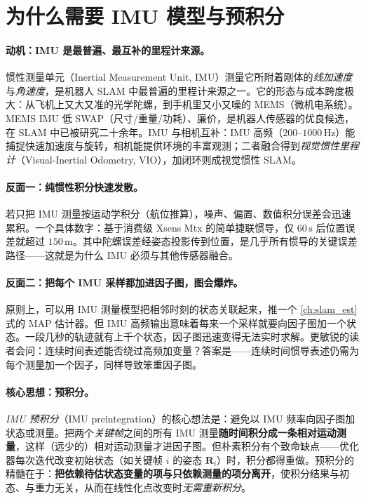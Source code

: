 \section{为什么需要 IMU 模型与预积分}
\label{sec:imu-why}

\paragraph{动机：IMU 是最普遍、最互补的里程计来源。}
惯性测量单元（Inertial Measurement Unit, IMU）测量它所附着刚体的\emph{线加速度}与\emph{角速度}，是机器人 SLAM 中最普遍的里程计来源之一\cite{carlone2026handbook}。它的形态与成本跨度极大：从飞机上又大又准的光学陀螺，到手机里又小又噪的 MEMS（微机电系统）。MEMS IMU 低 SWAP（尺寸/重量/功耗）、廉价，是机器人传感器的优良候选，在 SLAM 中已被研究二十余年。IMU 与相机互补：IMU 高频（$200$--$1000\,\mathrm{Hz}$）能捕捉快速加速度与旋转，相机能提供环境的丰富观测；二者融合得到\emph{视觉惯性里程计}（Visual-Inertial Odometry, VIO），加闭环则成视觉惯性 SLAM。

\paragraph{反面一：纯惯性积分快速发散。}
若只把 IMU 测量按运动学积分（航位推算），噪声、偏置、数值积分误差会迅速累积。一个具体数字：基于消费级 Xsens Mtx 的简单捷联惯导，仅 $60\,\mathrm s$ 后位置误差就超过 $150\,\mathrm m$\cite{woodman2007inertial}。其中陀螺误差经姿态投影传到位置，是几乎所有惯导的关键误差路径——这就是为什么 IMU 必须与其他传感器融合。

\paragraph{反面二：把每个 IMU 采样都加进因子图，图会爆炸。}
原则上，可以用 IMU 测量模型把相邻时刻的状态关联起来，推一个 \cref{ch:slam_est} 式的 MAP 估计器。但 IMU 高频输出意味着每来一个采样就要向因子图加一个状态\cite{carlone2026handbook}。一段几秒的轨迹就有上千个状态，因子图迅速变得无法实时求解。更敏锐的读者会问：连续时间表述能否绕过高频加变量？答案是——连续时间惯导表述仍需为每个测量加一个因子，同样导致笨重因子图。

\paragraph{核心思想：预积分。}
\emph{IMU 预积分}（IMU preintegration）的核心想法是：避免以 IMU 频率向因子图加状态或测量。把两个\emph{关键帧}之间的所有 IMU 测量\textbf{随时间积分成一条相对运动测量}，这样（远少的）相对运动测量才进因子图。但朴素积分有个致命缺点——优化器每次迭代改变初始状态（如关键帧 $i$ 的姿态 $\mathbf R_i$）时，积分都得重做。预积分的精髓在于：\textbf{把依赖待估状态变量的项与只依赖测量的项分离开}，使积分结果与初态、与重力无关，从而在线性化点改变时\emph{无需重新积分}。

